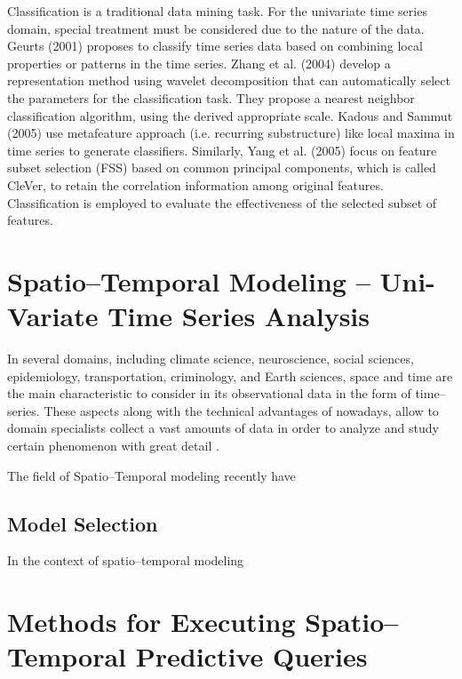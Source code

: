

Classification is a traditional data mining task. For the univariate time series domain, special treatment must be considered due to the nature of the data. Geurts (2001) proposes to classify time series data based on combining local properties or patterns in the time series. Zhang et al. (2004) develop a representation method using wavelet decomposition that can automatically select the parameters for the classification task. They propose a nearest neighbor classification algorithm, using the derived appropriate scale. Kadous and Sammut (2005) use metafeature approach (i.e. recurring substructure) like local maxima in time series to generate classifiers. Similarly, Yang et al. (2005) focus on feature subset selection (FSS) based on common principal components, which is called CleVer, to retain the correlation information among original features. Classification is employed to evaluate the effectiveness of the selected subset of features. 

\section{Spatio--Temporal Modeling -- Uni-Variate Time Series Analysis}
\label{Sec:STModeling}

In several domains, including climate science, neuroscience, social sciences, epidemiology, transportation, criminology, and Earth sciences, space and time are the main characteristic to consider in its observational data in the form of time--series. These aspects along with the technical advantages of nowadays, allow to domain specialists collect a vast amounts of data in order to analyze and study certain phenomenon with great detail \cite{}. 

The field of Spatio--Temporal modeling recently have 

\subsection{Model Selection}
\label{Sec:STModelSelection}

In the context of spatio--temporal modeling 

\section{Methods for Executing Spatio--Temporal Predictive Queries}
\label{Sec:RelatedWorksQueries}


